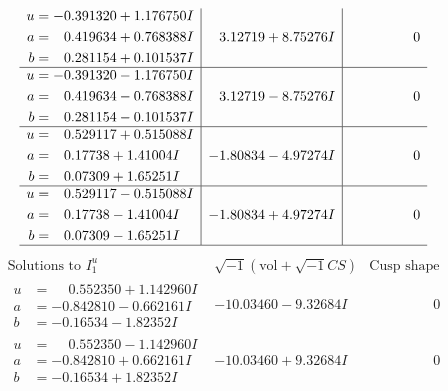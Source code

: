 \documentclass[1p]{elsarticle_modified}
\theoremstyle{definition}
\newcommand{\I}{\sqrt{-1}}
\begin{document}
$$\begin{array}{c|c|c}
\begin{aligned}
u &= -0.391320 + 1.176750 I \\
a &= \phantom{-}0.419634 + 0.768388 I \\
b &= \phantom{-}0.281154 + 0.101537 I\end{aligned}
 & \phantom{-}3.12719 + 8.75276 I & \phantom{-0.000000 } 0 \\ \hline\begin{aligned}
u &= -0.391320 - 1.176750 I \\
a &= \phantom{-}0.419634 - 0.768388 I \\
b &= \phantom{-}0.281154 - 0.101537 I\end{aligned}
 & \phantom{-}3.12719 - 8.75276 I & \phantom{-0.000000 } 0 \\ \hline\begin{aligned}
u &= \phantom{-}0.529117 + 0.515088 I \\
a &= \phantom{-}0.17738 + 1.41004 I \\
b &= \phantom{-}0.07309 + 1.65251 I\end{aligned}
 & -1.80834 - 4.97274 I & \phantom{-0.000000 } 0 \\ \hline\begin{aligned}
u &= \phantom{-}0.529117 - 0.515088 I \\
a &= \phantom{-}0.17738 - 1.41004 I \\
b &= \phantom{-}0.07309 - 1.65251 I\end{aligned}
 & -1.80834 + 4.97274 I & \phantom{-0.000000 } 0\\
 \hline 
 \end{array}$$\newpage$$\begin{array}{c|c|c}  
\text{Solutions to }I^u_{1}& \I (\text{vol} + \sqrt{-1}CS) & \text{Cusp shape}\\
 \hline 
\begin{aligned}
u &= \phantom{-}0.552350 + 1.142960 I \\
a &= -0.842810 - 0.662161 I \\
b &= -0.16534 - 1.82352 I\end{aligned}
 & -10.03460 - 9.32684 I & \phantom{-0.000000 } 0 \\ \hline\begin{aligned}
u &= \phantom{-}0.552350 - 1.142960 I \\
a &= -0.842810 + 0.662161 I \\
b &= -0.16534 + 1.82352 I\end{aligned}
 & -10.03460 + 9.32684 I & \phantom{-0.000000 } 0 \\ \hline\begin{aligned}

\end{aligned}
\end{array}$$
\end{document}
